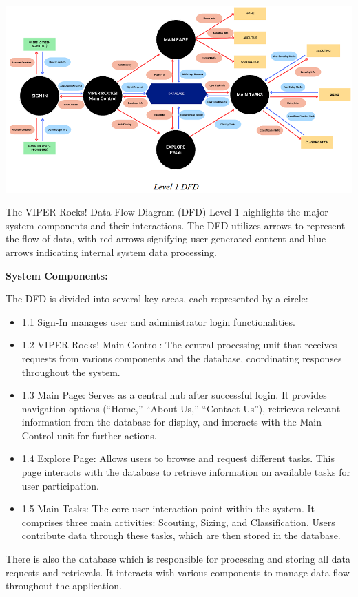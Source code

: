 \documentclass{article}
\begin{document}
\includegraphics{DFD_1}

The VIPER Rocks! Data Flow Diagram (DFD) Level 1 highlights the major system components and their interactions. The DFD utilizes arrows to represent the flow of data, with red arrows signifying user-generated content and blue arrows indicating internal system data processing.

\textbf{System Components:}

The DFD is divided into several key areas, each represented by a circle:
\begin{itemize}
	\item 1.1 Sign-In manages user and administrator login functionalities.
	\item 1.2 VIPER Rocks! Main Control: The central processing unit that receives requests from various components and the database, coordinating responses throughout the system. 
	\item 1.3 Main Page: Serves as a central hub after successful login. It provides navigation options (“Home,” “About Us,” “Contact Us”), retrieves relevant information from the database for display, and interacts with the Main Control unit for further actions.
	\item 1.4 Explore Page: Allows users to browse and request different tasks. This page interacts with the database to retrieve information on available tasks for user participation.
	\item 1.5 Main Tasks: The core user interaction point within the system. It comprises three main activities: Scouting, Sizing, and Classification. Users contribute data through these tasks, which are then stored in the database.
\end{itemize}
There is also the database which is responsible for processing and storing all data requests and retrievals. It interacts with various components to manage data flow throughout the application.
\end{document}
